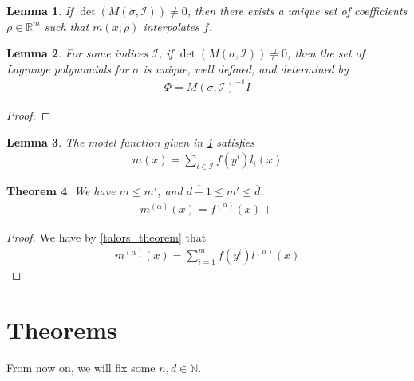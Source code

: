 \documentclass{article}
\newtheorem{theorem}{Theorem}[section]
\newtheorem{lemma}[theorem]{Lemma}
\theoremstyle{case}
\newcommand{\Rm}{\mathbb R^m}
\newcommand{\bidx}{{\mathcal I}}
\begin{document}
\begin{lemma}
\label{unique_model}
If $\det(M(\sigma, \bidx)) \ne 0$, then there exists a unique set of coefficients $\rho \in \Rm$ such that $m(x; \rho)$ interpolates $f$.
\end{lemma}


\begin{lemma}
For some indices $\bidx$, if $\det(M(\sigma, \bidx)) \ne 0$, then the set of Lagrange polynomials for $\sigma$ is unique, well defined, and determined by
\begin{align*}
\Phi = M(\sigma, \bidx)^{-1}I
\end{align*}
\end{lemma}
\begin{proof}
\end{proof}


\begin{lemma}
The model function given in \cref{unique_model} satisfies
\begin{align*}
m(x) = \sum_{i \in \bidx} f(y^i) l_i(x)
\end{align*}
\end{lemma}



\begin{theorem}
We have
$m \le m'$, and 
$\overline{d-1} \le m' \le \overline{d}$.
\begin{align*}
m^{(\alpha)}(x) = f^{(\alpha)}(x) + 
\end{align*}
\end{theorem}

\begin{proof}
We have by \cref{talors_theorem} that 
\begin{align*}
m^{(\alpha)}(x) = \sum_{i=1}^m f(y^i) l^{(\alpha)}(x)
\end{align*}

\end{proof}







\section{Theorems}
From now on, we will fix some $n, d \in \mathbb N$.
\end{document}

